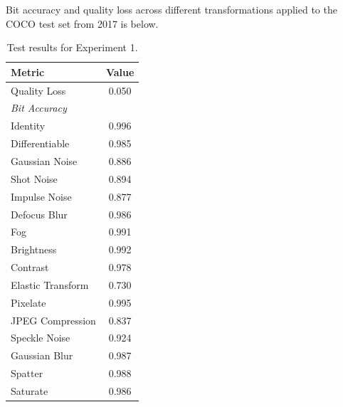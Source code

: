 \documentclass[twocolumn]{article}
\begin{document}
Bit accuracy and quality loss across different transformations applied to the COCO test set from 2017 is below.
\begin{table}[h]
\centering
\begin{tabular}{lc}
\hline
Metric & Value \\
\hline
Quality Loss & 0.050 \\
\hline
\multicolumn{2}{l}{\textit{Bit Accuracy}} \\
\hline
Identity & 0.996 \\
Differentiable & 0.985 \\
Gaussian Noise & 0.886 \\
Shot Noise & 0.894 \\
Impulse Noise & 0.877 \\
Defocus Blur & 0.986 \\
Fog & 0.991 \\
Brightness & 0.992 \\
Contrast & 0.978 \\
Elastic Transform & 0.730 \\
Pixelate & 0.995 \\
JPEG Compression & 0.837 \\
Speckle Noise & 0.924 \\
Gaussian Blur & 0.987 \\
Spatter & 0.988 \\
Saturate & 0.986 \\
\hline
\end{tabular}
\caption{Test results for Experiment 1.}
\label{tab:experiment_1}
\end{table}















\section*{}
\end{document}
